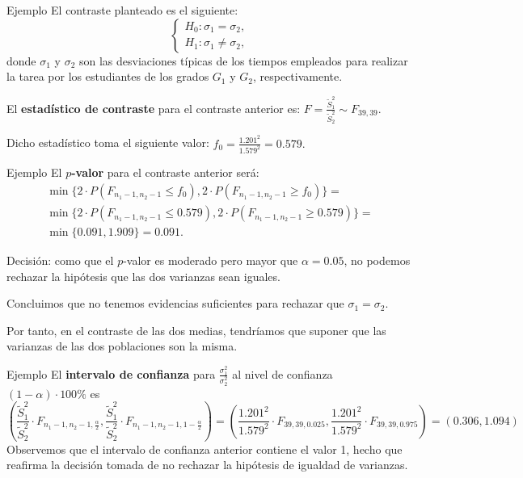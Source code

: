 \documentclass[
  ignorenonframetext,
]{beamer}
\begin{document}
\begin{frame}{Ejemplo}
\protect\hypertarget{ejemplo-20}{}
El contraste planteado es el siguiente: \[
\left\{\begin{array}{l}
H_0:\sigma_1=\sigma_2,\\
H_1:\sigma_1\neq \sigma_2,
\end{array}\right.
\] donde \(\sigma_1\) y \(\sigma_2\) son las desviaciones típicas de los
tiempos empleados para realizar la tarea por los estudiantes de los
grados \(G_1\) y \(G_2\), respectivamente.

El \textbf{estadístico de contraste} para el contraste anterior es:
\(F=\frac{\widetilde{S}_1^2}{\widetilde{S}_2^2}\sim F_{39,39}\).

Dicho estadístico toma el siguiente valor:
\(f_0=\frac{1.201^2}{1.579^2}=0.579.\)
\end{frame}

\begin{frame}{Ejemplo}
\protect\hypertarget{ejemplo-21}{}
El \textbf{\(p\)-valor} para el contraste anterior será: \[
\begin{array}{l}
\min\{2\cdot P(F_{n_1-1,n_2-1}\leq f_0),2\cdot P(F_{n_1-1,n_2-1}\geq f_0)\}= \\
\min\{2\cdot P(F_{n_1-1,n_2-1}\leq 0.579),2\cdot P(F_{n_1-1,n_2-1}\geq 0.579)\} 
= \\ \min\{0.091,1.909\}=0.091.
\end{array}
\]

Decisión: como que el \(p\)-valor es moderado pero mayor que
\(\alpha=0.05\), no podemos rechazar la hipótesis que las dos varianzas
sean iguales.

Concluimos que no tenemos evidencias suficientes para rechazar que
\(\sigma_1= \sigma_2\).

Por tanto, en el contraste de las dos medias, tendríamos que suponer que
las varianzas de las dos poblaciones son la misma.
\end{frame}

\begin{frame}{Ejemplo}
\protect\hypertarget{ejemplo-22}{}
El \textbf{intervalo de confianza} para
\(\frac{\sigma_1^2}{\sigma_2^2}\) al nivel de confianza
\((1-\alpha)\cdot 100\%\) es \[
\left(\frac{\widetilde{S}_1^2}{\widetilde{S}_2^2}\cdot F_{n_1-1,n_2-1,\frac{\alpha}2},\frac{\widetilde{S}_1^2}{\widetilde{S}_2^2}\cdot F_{n_1-1,n_2-1,1-\frac{\alpha}2}\right) =
\left(\frac{1.201^2}{1.579^2}\cdot F_{39,39,0.025},\frac{1.201^2}{1.579^2}\cdot F_{39,39,0.975}\right)=(0.306,1.094)
\] Observemos que el intervalo de confianza anterior contiene el valor
1, hecho que reafirma la decisión tomada de no rechazar la hipótesis de
igualdad de varianzas.
\end{frame}
\end{document}
